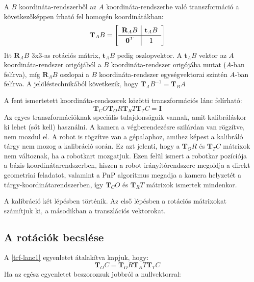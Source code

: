 \documentclass{article}
\begin{document}
	A $B$ koordináta-rendszerből az $A$ koordináta-rendszerbe való transzformáció a következőképpen írható fel homogén koordinátákban:
	\begin{equation}
	\label{trf-kifejt}
	\mathbf{T}_AB = 
	\left[
	\def\arraystretch{1.2}
	\begin{array}{c|c}
 	\mathbf{R}_AB & \mathbf{t}_AB \\
 	\hline
	\mathbf{0}^T & 1 \\
	\end{array}	
	\right]
	\end{equation}
	Itt $\mathbf{R}_AB$ 3x3-as rotációs mátrix, $\mathbf{t}_AB$ pedig oszlopvektor. A $\mathbf{t}_AB$ vektor az $A$ koordináta-rendszer origójából a $B$ koordináta-rendszer origójába mutat ($A$-ban felírva), míg $\mathbf{R}_AB$ oszlopai a $B$ koordináta-rendszer egységvektorai szintén $A$-ban felírva.
	A jelöléstechnikából következik, hogy $\mathbf{T}_AB^{-1} = \mathbf{T}_BA$
	
	A fent ismertetett koordináta-rendszerek közötti transzformációs lánc felírható:
	\begin{equation}\label{trf-lanc1}
	\mathbf{T}_CO\mathbf{T}_OR\mathbf{T}_RT\mathbf{T}_TC = \mathbf{I}
	\end{equation}
	Az egyes transzformációknak speciális tulajdonságaik vannak, amit kalibráláskor ki lehet (sőt kell) használni. A kamera a végberendezésre szilárdan van rögzítve, nem mozdul el. A robot is rögzítve van a gépalaphoz, amihez képest a kalibráló tárgy nem mozog a kalibráció során. Ez azt jelenti, hogy a $\mathbf{T}_OR$ és $\mathbf{T}_TC$ mátrixok nem változnak, ha a robotkart mozgatjuk. Ezen felül ismert a robotkar pozíciója a bázis-koordinátarendszerben, hiszen a robot irányítórendszere megoldja a direkt geometriai feladatot, valamint a PnP algoritmus megadja a kamera helyzetét a tárgy-koordinátarendszerben, így $\mathbf{T}_CO$ és $\mathbf{T}_RT$ mátrixok ismertek mindenkor.
	
	A kalibráció két lépésben történik. Az első lépésben a rotációs mátrixokat számítjuk ki, a másodikban a transzlációs vektorokat.
	\subsection{A rotációk becslése}
	A \eqref{trf-lanc1} egyenletet átalakítva kapjuk, hogy:
	\begin{equation}
	\label{trf-lanc2}
	\mathbf{T}_OC = \mathbf{T}_OR\mathbf{T}_RT\mathbf{T}_TC
	\end{equation}
	Ha az egész egyenletet beszorozzuk jobbról a nullvektorral:
	
\end{document}
